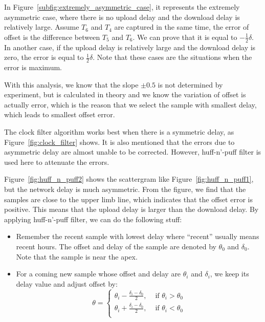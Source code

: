 In Figure~\ref{subfig:extremely_asymmetric_case}, it represents the extremely
asymmetric case, where there is no upload delay and the download delay is
relatively large. Assume $T_6$ and $T_4$ are captured in the same time, the
error of offset is the difference between $T_5$ and $T_6$. We can prove that it
is equal to $-\frac{1}{2}\delta$. In another case, if the upload delay is
relatively large and the download delay is zero, the error is equal to
$\frac{1}{2}\delta$. Note that these cases are the situations when the error is
maximum.

With this analysis, we know that the slope $\pm0.5$ is not determined by
experiment, but is calculated in theory and we know the variation of offset is
actually error, which is the reason that we select the sample with smallest
delay, which leads to smallest offset error.

The clock filter algorithm works best when there is a symmetric delay, as
Figure~\ref{fig:clock_filter} shows. It is also mentioned that the errors due
to asymmetric delay are almost unable to be corrected. However, huff-n'-puff
filter is used here to attenuate the errors.

Figure~\ref{fig:huff_n_puff2} shows the scattergram like
Figure~\ref{fig:huff_n_puff1}, but the network delay is much asymmetric. From
the figure, we find that the samples are close to the upper limb line, which
indicates that the offset error is positive. This means that the upload delay
is larger than the download delay. By applying huff-n'-puff filter, we can do
the following stuff:
\begin{itemize}
    \item 
        Remember the recent sample with lowest delay where ``recent'' usually
        means recent hours. The offset and delay of the sample are denoted by 
        $\theta_0$ and $\delta_0$. Note that the sample is near the apex.
    \item 
        For a coming new sample whose offset and delay are $\theta_i$ and
        $\delta_i$, we keep its delay value and adjust offset by:
        \begin{equation}
            \theta = 
            \begin{cases}
                \displaystyle
                \theta_i - \frac{\delta_i - \delta_0}{2}, &\text{ if }\theta_i
                > \theta_0\\
                \displaystyle
                \theta_i + \frac{\delta_i - \delta_0}{2}, &\text{ if }\theta_i
                < \theta_0\\
            \end{cases}
            \label{eq:huff_n_puff}
        \end{equation}
\end{itemize}

